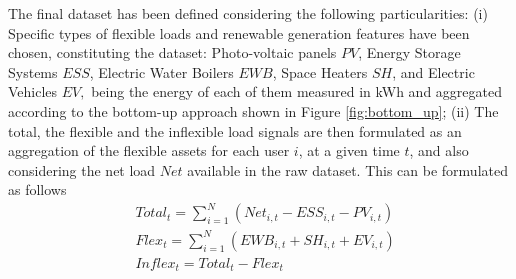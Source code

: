 \begin{table}[]
\centering
\caption{Dataport dataset overview: Austin, Texas}
\label{table:dataport_austin}
\end{table}

The final dataset has been defined considering the following particularities: (i) Specific types of flexible loads and renewable generation features have been chosen, constituting the dataset: Photo-voltaic panels $PV$, Energy Storage Systems $ESS$, Electric Water Boilers $EWB$, Space Heaters $SH$, and Electric Vehicles $EV,$ being the energy of each of them measured in kWh and aggregated according to the bottom-up approach shown in Figure \ref{fig:bottom_up}; (ii) The total, the flexible and the inflexible load signals are then formulated as an aggregation of the flexible assets for each user $i$, at a given time $t$, and also considering the net load $Net$ available in the raw dataset. This can be formulated as follows 
\begin{subequations}
\begin{align} 
  & Total_{t} = \sum_{i=1}^{N} (Net_{i,t} - ESS_{i,t} - PV_{i,t}) \\
  & Flex_{t} = \sum_{i=1}^{N} (EWB_{i,t} +  SH_{i,t} + EV_{i,t}) \\
  & Inflex_{t} = Total_{t} - Flex_{t}
\end{align}
\end{subequations}

